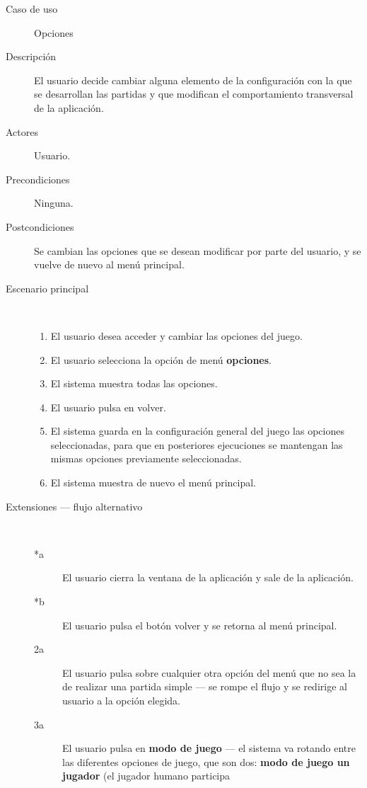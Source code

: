 \begin{description}
    \item[Caso de uso] Opciones
    \item[Descripción] El usuario decide cambiar alguna elemento de la configuración con la que se desarrollan
            las partidas y que modifican el comportamiento transversal de la aplicación.
    \item[Actores] Usuario.
    \item[Precondiciones] Ninguna.
    \item[Postcondiciones] Se cambian las opciones que se desean modificar por parte del usuario, y se vuelve
            de nuevo al menú principal.
    \item[Escenario principal] $\quad$
        \begin{enumerate}
            \item El usuario desea acceder y cambiar las opciones del juego.
            \item El usuario selecciona la opción de menú \textbf{opciones}.
            \item El sistema muestra todas las opciones.
            \item El usuario pulsa en volver.
            \item El sistema guarda en la configuración general del juego las opciones seleccionadas, para
                    que en posteriores ejecuciones se mantengan las mismas opciones previamente seleccionadas.
            \item El sistema muestra de nuevo el menú principal.
        \end{enumerate}
    \item[Extensiones --- flujo alternativo] $\quad$
        \begin{description}
            \item[*a ] El usuario cierra la ventana de la aplicación y sale de la aplicación.
            \item[*b ] El usuario pulsa el botón volver y se retorna al menú principal.
            \item[2a ] El usuario pulsa sobre cualquier otra opción del menú que no sea la de realizar una
                    partida simple --- se rompe el flujo y se redirige al usuario a la opción elegida.
            \item[3a ] El usuario pulsa en \textbf{modo de juego} --- el sistema va rotando entre las diferentes
                    opciones de juego, que son dos: \textbf{modo de juego un jugador} (el jugador humano participa

\end{description}
\end{description}
